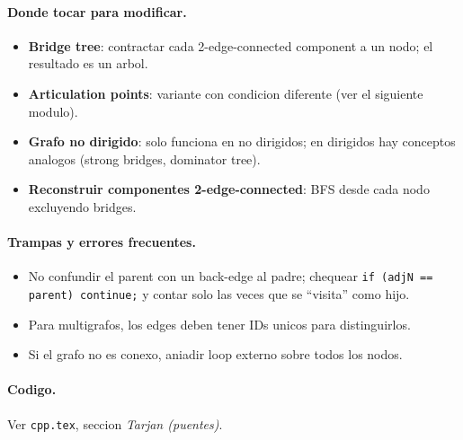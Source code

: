 \paragraph{Donde tocar para modificar.}
\begin{itemize}\setlength\itemsep{0pt}
	\item \textbf{Bridge tree}: contractar cada 2-edge-connected component a un nodo; el resultado es un arbol.
	\item \textbf{Articulation points}: variante con condicion diferente (ver el siguiente modulo).
	\item \textbf{Grafo no dirigido}: solo funciona en no dirigidos; en dirigidos hay conceptos analogos (strong bridges, dominator tree).
	\item \textbf{Reconstruir componentes 2-edge-connected}: BFS desde cada nodo excluyendo bridges.
\end{itemize}

\paragraph{Trampas y errores frecuentes.}
\begin{itemize}\setlength\itemsep{0pt}
	\item No confundir el parent con un back-edge al padre; chequear \texttt{if (adjN == parent) continue;} y contar solo las veces que se ``visita'' como hijo.
	\item Para multigrafos, los edges deben tener IDs unicos para distinguirlos.
	\item Si el grafo no es conexo, aniadir loop externo sobre todos los nodos.
\end{itemize}

\paragraph{Codigo.}
Ver \texttt{cpp.tex}, seccion \textit{Tarjan (puentes)}.

\vspace{0.5em}
